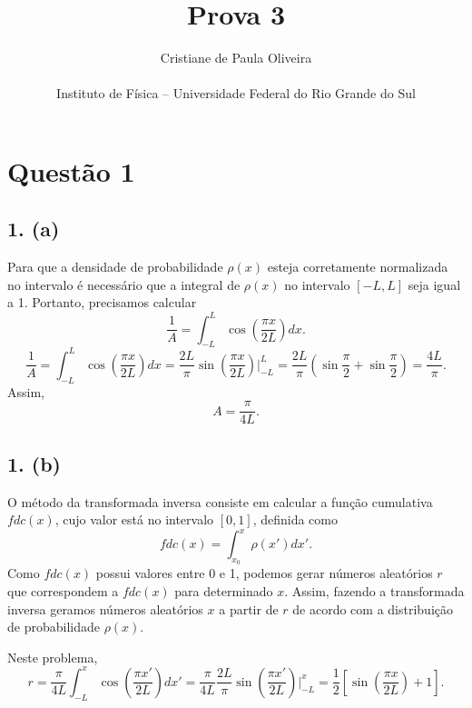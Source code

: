 \documentclass[brazilian, 12pt, a4paper, final]{article}
\title{\textbf{Prova 3}}
\author{Cristiane de Paula Oliveira\\\\\small{Instituto de Física -- Universidade Federal do Rio Grande do Sul}}
\begin{document}
\maketitle

\section*{Questão 1}
\subsection*{1. (a)}
Para que a densidade de probabilidade $\rho(x)$ esteja corretamente normalizada no intervalo é necessário que a integral de $\rho(x)$ no intervalo $[-L,L]$ seja  igual a 1.
Portanto, precisamos calcular
\begin{equation}
	\frac{1}{A}=\int_{-L}^{L}\cos\left(\frac{\pi x}{2L}\right)dx.
\end{equation}
\begin{equation*}
	\frac{1}{A}=\int_{-L}^{L}\cos\left(\frac{\pi x}{2L}\right)dx=\frac{2L}{\pi}\sin\left(\frac{\pi x}{2L}\right)\bigg\rvert_{-L}^{L}=\frac{2L}{\pi}\left(\sin\frac{\pi}{2}+\sin\frac{\pi}{2}\right)=\frac{4L}{\pi}.
\end{equation*}
Assim, 
\begin{equation}
A=\frac{\pi}{4L}.
\end{equation}

\subsection*{1. (b)}
O método da transformada inversa consiste em calcular a função cumulativa $fdc(x)$, cujo valor está no intervalo $[0,1]$, definida como
\begin{equation}
	fdc(	x)=\int_{x_0}^{x}\rho(x')dx'.
\end{equation}
Como $fdc(x)$ possui valores entre 0 e 1, podemos gerar números aleatórios $r$ que correspondem a $fdc(x)$ para determinado $x$. Assim, fazendo a transformada inversa geramos números aleatórios $x$ a partir de $r$ de acordo com a distribuição de probabilidade $\rho(x)$. 

Neste problema,
\begin{equation*}
	r=\frac{\pi}{4L}\int_{-L}^{x}\cos\left(\frac{\pi x'}{2L}\right)dx'=\frac{\pi}{4L}\frac{2L}{\pi}\sin\left(\frac{\pi x'}{2L}\right)\bigg\rvert_{-L}^{x}=\frac{1}{2}\left[\sin\left(\frac{\pi x}{2L}\right)+1 \right].
\end{equation*}
\end{document}
